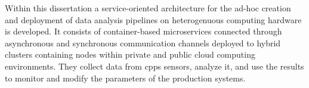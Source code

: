 Within this dissertation a service-oriented architecture for the ad-hoc creation and deployment of data analysis pipelines on heterogenuous computing hardware is developed.
It consists of container-based microservices connected through asynchronous and synchronous communication channels deployed to hybrid clusters containing nodes within private and public cloud computing environments.
They collect data from \ac{cpps} sensors, analyze it, and use the results to monitor and modify the parameters of the production systems.

